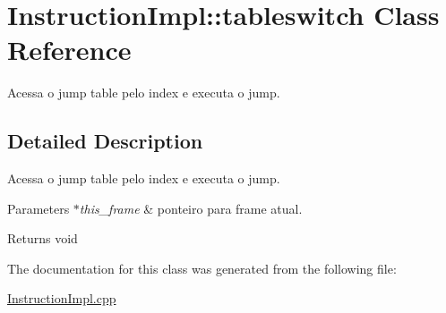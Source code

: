 \hypertarget{class_instruction_impl_1_1tableswitch}{}\section{Instruction\+Impl\+:\+:tableswitch Class Reference}
\label{class_instruction_impl_1_1tableswitch}


Acessa o jump table pelo index e executa o jump.  




\subsection{Detailed Description}
Acessa o jump table pelo index e executa o jump. 


\begin{DoxyParams}{Parameters}
{\em $\ast$this\+\_\+frame} & ponteiro para frame atual. \\
\hline
\end{DoxyParams}
\begin{DoxyReturn}{Returns}
void 
\end{DoxyReturn}


The documentation for this class was generated from the following file\+:\begin{DoxyCompactItemize}
\item 
\hyperlink{_instruction_impl_8cpp}{Instruction\+Impl.\+cpp}\end{DoxyCompactItemize}
